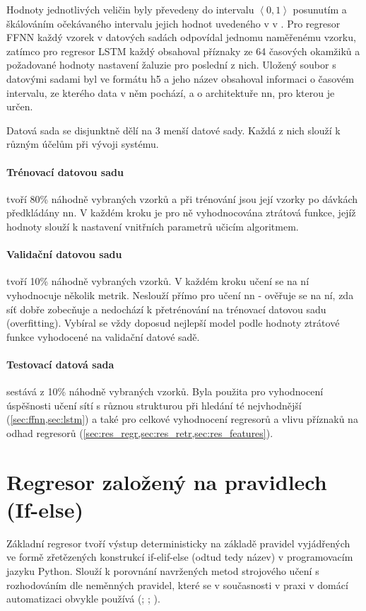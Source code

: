         Hodnoty jednotlivých veličin byly převedeny do intervalu $\left\langle 0,1\right\rangle$ posunutím a škálováním očekávaného intervalu jejich hodnot uvedeného v  v . Pro regresor FFNN každý vzorek v datových sadách odpovídal jednomu naměřenému vzorku, zatímco pro regresor LSTM každý obsahoval příznaky ze 64 časových okamžiků a požadované hodnoty nastavení žaluzie pro poslední z nich. Uložený soubor s datovými sadami byl ve formátu h5 a jeho název obsahoval informaci o časovém intervalu, ze kterého data v něm pochází, a o architektuře \acrshort{nn}, pro kterou je určen.

        Datová sada se disjunktně dělí na 3 menší datové sady. Každá z nich slouží k různým účelům při vývoji systému.
        \paragraph{Trénovací datovou sadu}tvoří 80\% náhodně vybraných vzorků a při trénování jsou její vzorky po dávkách předkládány \acrshort{nn}. V každém kroku je pro ně vyhodnocována ztrátová funkce, jejíž hodnoty slouží k nastavení vnitřních parametrů učicím algoritmem.
        \paragraph{Validační datovou sadu}tvoří 10\% náhodně vybraných vzorků. V každém kroku učení se na ní vyhodnocuje několik metrik. Neslouží přímo pro učení \acrshort{nn} - ověřuje se na ní, zda síť dobře zobecňuje a nedochází k přetrénování na trénovací datovou sadu (overfitting). Vybíral se vždy doposud nejlepší model podle hodnoty ztrátové funkce vyhodocené na validační datové sadě.
        \paragraph{Testovací datová sada}sestává z 10\% náhodně vybraných vzorků. Byla použita pro vyhodnocení úspěšnosti učení sítí s různou strukturou při hledání té nejvhodnější (\cref{sec:ffnn,sec:lstm}) a také pro celkové vyhodnocení regresorů a vlivu příznaků na odhad regresorů (\cref{sec:res_regr,sec:res_retr,sec:res_features}).
            \label{ssec:test}

    \section{Regresor založený na pravidlech (If-else)}
        Základní regresor  tvoří výstup deterministicky na základě pravidel vyjádřených ve formě zřetězených konstrukcí if-elif-else (odtud tedy název) v programovacím jazyku Python. Slouží k porovnání navržených metod strojového učení s rozhodováním dle neměnných pravidel, které se v současnosti v praxi v domácí automatizaci obvykle používá (\cite{apple:home}; \cite{openhab:openhab}; \cite{hass:hass}).

